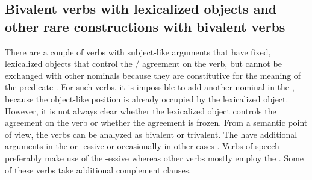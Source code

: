 
\subsection{Bivalent verbs with lexicalized objects and other rare constructions with bivalent verbs}
\label{sec:Bivalent verbs with frozen objects}

There are a couple of verbs with  subject-like arguments that have fixed, lexicalized objects that control the / agreement on the verb, but cannot be exchanged with other nominals because they are constitutive for the meaning of the predicate . For such verbs, it is impossible to add another nominal in the , because the object-like position is already occupied by the lexicalized object. However, it is not always clear whether the lexicalized object controls the  agreement on the verb or whether the  agreement is frozen. From a semantic point of view, the verbs can be analyzed as bivalent or trivalent. The  have additional arguments in the   or -essive  or occasionally in other cases . Verbs of speech preferably make use of the -essive whereas other verbs mostly employ the . Some of these verbs take additional complement clauses.

